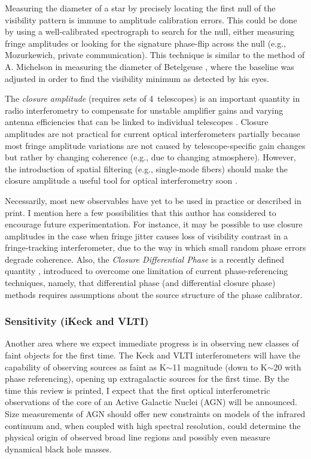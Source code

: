 \documentclass[12pt]{article}
\begin{document}
Measuring the diameter of a star by precisely locating the first null
of the visibility pattern is immune to amplitude calibration errors.
This could be done by using a well-calibrated spectrograph to search
for the null, either measuring fringe amplitudes or looking for the
signature phase-flip across the null (e.g., Mozurkewich, private
communication).  This technique is similar to the method of A.
Michelson in measuring the diameter of Betelgeuse
\citep{michelson1921}, where the baseline was adjusted in order to
find the visibility minimum as detected by his eyes.

The {\em closure amplitude} (requires sets of 4~telescopes) is an
important quantity in radio interferometry to compensate for unstable
amplifier gains and varying antenna efficiencies that can be linked to
individual telescopes \citep[e.g.,][]{readhead1980}.  Closure
amplitudes are not practical for current optical interferometers
partially because most fringe amplitude variations are not caused by
telescope-specific gain changes but rather by changing coherence
(e.g., due to changing atmosphere).  However, the introduction of
spatial filtering (e.g., single-mode fibers) should make the closure
amplitude a useful tool for optical interferometry soon \citep[see
discussion in][]{monnier_mss}.  

Necessarily, most new observables have yet to be used in practice or
described in print.  I mention here a few possibilities that this
author has considered to encourage future experimentation.  For
instance, it may be possible to use closure amplitudes in the
case when fringe jitter causes loss of visibility contrast in a
fringe-tracking interferometer, due to the way in which small random
phase errors degrade coherence. Also, the {\em Closure Differential
  Phase} is a recently defined quantity \citep{monnier2002},
introduced to overcome one limitation of current phase-referencing
techniques, namely, that differential phase (and differential closure
phase) methods requires assumptions about the source structure of the
phase calibrator.  

\subsubsection{Sensitivity (iKeck and VLTI)}
Another area where we expect immediate progress is in observing new
classes of faint objects for the first time.  The Keck and VLTI
interferometers will have the capability of observing sources as faint
as K$\sim$11 magnitude (down to K$\sim$20 with phase referencing),
opening up extragalactic sources for the first time.  By the time this
review is printed, I expect that the first optical interferometric
observations of the core of an Active Galactic Nuclei (AGN) will be
announced.  Size measurements of AGN should offer new constraints on
models of the infrared continuum and, when coupled with high spectral
resolution, could determine the physical origin of observed broad line
regions and possibly even measure dynamical black hole masses.
\end{document}
